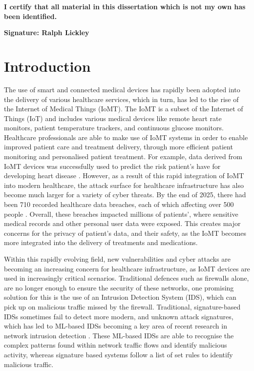 \documentclass[11pt,a4paper]{article}
\begin{document}
\begin{checkbox_t}
    \item {\bf I certify that all material in this dissertation which is not my own has been identified.}
\end{checkbox_t}

\vspace{1em}
{\bf\noindent Signature: Ralph Lickley}
\newpage

\tableofcontents
\thispagestyle{empty}
\newpage

\clearpage
{}

\section{Introduction}
The use of smart and connected medical devices has rapidly been adopted into the delivery of various healthcare services, which in turn, has led to the rise of the Internet of Medical Things (IoMT). The IoMT is a subset of the Internet of Things (IoT) and includes various medical devices like remote heart rate monitors, patient temperature trackers, and continuous glucose monitors. Healthcare professionals are able to make use of IoMT systems in order to enable improved patient care and treatment delivery, through more efficient patient monitoring and personalised patient treatment. For example, data derived from IoMT devices was successfully used to predict the risk patient’s have for developing heart disease \cite{baseer2024healthcare}. However, as a result of this rapid integration of IoMT into modern healthcare, the attack surface for healthcare infrastructure has also become much larger for a variety of cyber threats. By the end of 2025, there had been 710 recorded healthcare data breaches, each of which affecting over 500 people \cite{hipaajournal}. Overall, these breaches impacted millions of patients’, where sensitive medical records and other personal user data were exposed. This creates major concerns for the privacy of patient’s data, and their safety, as the IoMT becomes more integrated into the delivery of treatments and medications.

Within this rapidly evolving field, new vulnerabilities and cyber attacks are becoming an increasing concern for healthcare infrastructure, as IoMT devices are used in increasingly critical scenarios. Traditional defences such as firewalls alone, are no longer enough to ensure the security of these networks, one promising solution for this is the use of an Intrusion Detection System (IDS), which can pick up on malicious traffic missed by the firewall. Traditional, signature-based IDSs sometimes fail to detect more modern, and unknown attack signatures, which has led to ML-based IDSs becoming a key area of recent research in network intrusion detection \cite{althubitiids, agarapneuralids, pramilaraniforest}. These ML-based IDSs are able to recognise the complex patterns found within network traffic flows and identify malicious activity, whereas signature based systems follow a list of set rules to identify malicious traffic.
\end{document}
